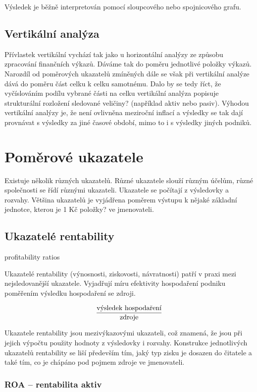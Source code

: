 Výsledek je běžně interpretován pomocí sloupcového nebo spojnicového grafu. 


\subsection{Vertikální analýza}
Přívlastek vertikální vychází tak jako u horizontální analýzy ze způsobu zpracování finančních výkazů. Dáváme tak do poměru jednotlivé položky výkazů. Narozdíl od poměrových ukazatelů zmíněných dále se však při vertikální analýze dává do poměru část celku k celku samotnému. Dalo by se tedy říct, že vyčíslováním podílu vybrané části na celku vertikální analýza popisuje strukturální rozložení sledované veličiny? (například aktiv nebo pasiv). 
Výhodou vertikální analýzy je, že není ovlivněna meziroční inflací a výsledky se tak dají provnávat s výsledky za jiné časové období, mimo to i s výsledky jiných podniků\cite{sedl}.

\section{Poměrové ukazatele}
Existuje několik různých ukazatelů. Různé ukazatele slouží různým účelům, různé společnosti se řídí různými ukazateli. Ukazatele se počítají z výsledovky a rozvahy. Většina ukazatelů je vyjádřena poměrem výstupu k nějaké základní jednotce, kterou je 1 Kč položky? ve jmenovateli.


\subsection{Ukazatelé rentability}
profitability ratios

Ukazatelé rentability (výnosnosti, ziskovosti, návratnosti) patří v praxi mezi nejsledovanější ukazatele. Vyjadřují míru efektivity hospodaření podniku poměřením výsledku hospodaření se zdroji.

$$\dfrac{\text{výsledek hospodaření}}{\text{zdroje}}$$

Ukazatele rentability jsou mezivýkazovými ukazateli, což znamená, že jsou při jejich výpočtu použity hodnoty z výsledovky i rozvahy. Konstrukce jednotlivých ukazatelů rentability se liší především tím, jaký typ zisku je dosazen do čitatele a také tím, co je chápáno pod pojmem zdroje ve jmenovateli\cite{mendelu}.

\subsubsection{ROA -- rentabilita aktiv}

